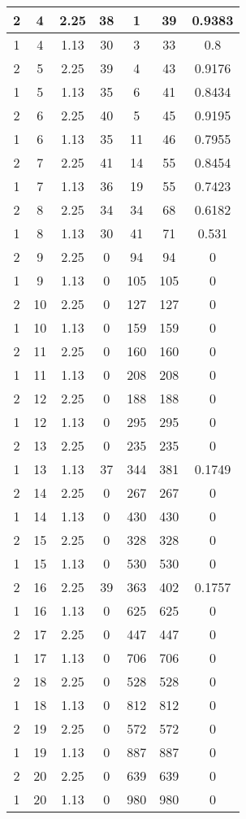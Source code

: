 \documentclass[letterpaper, 12pt]{article}
\begin{document}
\begin{longtable}{|c|c|c|c|c|c|c|}
\hline
2 & 4 & 2.25 & 38 & 1 & 39 & 0.9383 \\
\hline
1 & 4 & 1.13 & 30 & 3 & 33 & 0.8 \\
\hline
2 & 5 & 2.25 & 39 & 4 & 43 & 0.9176 \\
\hline
1 & 5 & 1.13 & 35 & 6 & 41 & 0.8434 \\
\hline
2 & 6 & 2.25 & 40 & 5 & 45 & 0.9195 \\
\hline
1 & 6 & 1.13 & 35 & 11 & 46 & 0.7955 \\
\hline
2 & 7 & 2.25 & 41 & 14 & 55 & 0.8454 \\
\hline
1 & 7 & 1.13 & 36 & 19 & 55 & 0.7423 \\
\hline
2 & 8 & 2.25 & 34 & 34 & 68 & 0.6182 \\
\hline
1 & 8 & 1.13 & 30 & 41 & 71 & 0.531 \\
\hline
2 & 9 & 2.25 & 0 & 94 & 94 & 0 \\
\hline
1 & 9 & 1.13 & 0 & 105 & 105 & 0 \\
\hline
2 & 10 & 2.25 & 0 & 127 & 127 & 0 \\
\hline
1 & 10 & 1.13 & 0 & 159 & 159 & 0 \\
\hline
2 & 11 & 2.25 & 0 & 160 & 160 & 0 \\
\hline
1 & 11 & 1.13 & 0 & 208 & 208 & 0 \\
\hline
2 & 12 & 2.25 & 0 & 188 & 188 & 0 \\
\hline
1 & 12 & 1.13 & 0 & 295 & 295 & 0 \\
\hline
2 & 13 & 2.25 & 0 & 235 & 235 & 0 \\
\hline
1 & 13 & 1.13 & 37 & 344 & 381 & 0.1749 \\
\hline
2 & 14 & 2.25 & 0 & 267 & 267 & 0 \\
\hline
1 & 14 & 1.13 & 0 & 430 & 430 & 0 \\
\hline
2 & 15 & 2.25 & 0 & 328 & 328 & 0 \\
\hline
1 & 15 & 1.13 & 0 & 530 & 530 & 0 \\
\hline
2 & 16 & 2.25 & 39 & 363 & 402 & 0.1757 \\
\hline
1 & 16 & 1.13 & 0 & 625 & 625 & 0 \\
\hline
2 & 17 & 2.25 & 0 & 447 & 447 & 0 \\
\hline
1 & 17 & 1.13 & 0 & 706 & 706 & 0 \\
\hline
2 & 18 & 2.25 & 0 & 528 & 528 & 0 \\
\hline
1 & 18 & 1.13 & 0 & 812 & 812 & 0 \\
\hline
2 & 19 & 2.25 & 0 & 572 & 572 & 0 \\
\hline
1 & 19 & 1.13 & 0 & 887 & 887 & 0 \\
\hline
2 & 20 & 2.25 & 0 & 639 & 639 & 0 \\
\hline
1 & 20 & 1.13 & 0 & 980 & 980 & 0 \\
\hline
\end{longtable}
\end{document}
